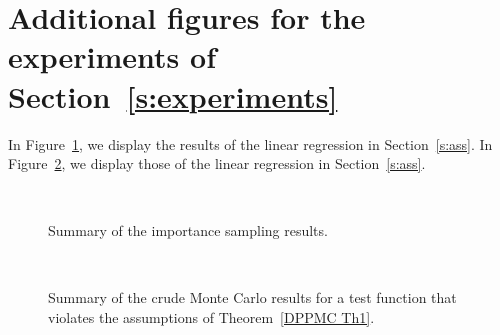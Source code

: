 \documentclass[a4paper,11pt]{article}
\numberwithin{equation}{section}
\theoremstyle{definition}
\newcommand{\rev}[1]{#1}
\def\figdir{.}
\begin{document}
\newpage
\section{Additional figures for the experiments of Section~\ref{s:experiments}}
\label{a:figures}

\rev{In Figure~\ref{f:resultsIS}, we display the results of the linear regression in Section~\ref{s:ass}. In Figure~\ref{f:resultsAss}, we display those of the linear regression in Section~\ref{s:ass}.}

\begin{figure}[h]
\\
\centering
{}
\caption{Summary of the importance sampling results.}
\label{f:resultsIS}
\end{figure}

\begin{figure}
\\
\centering
{}

\caption{Summary of the crude Monte Carlo results for a test function that violates the assumptions of Theorem~\ref{DPPMC Th1}.}
\label{f:resultsAss}
\end{figure}

\newpage


\end{document}
